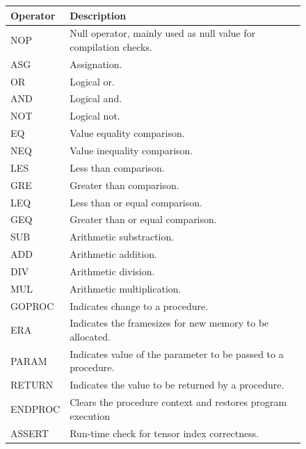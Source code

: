 \begin{figure}[h]
    \centering
    \begin{tabular}{p{1in}p{3in}}
        \toprule
        \textbf{Operator} & \textbf{Description}\\
        \midrule NOP &
        Null operator, mainly used as null value for \newline compilation checks.\\

        \midrule ASG & Assignation.\\

        \midrule OR & Logical or.\\
        \midrule AND & Logical and.\\
        \midrule NOT & Logical not.\\

        \midrule EQ & Value equality comparison.\\
        \midrule NEQ & Value inequality comparison.\\

        \midrule LES & Less than comparison.\\
        \midrule GRE & Greater than comparison.\\
        \midrule LEQ & Less than or equal comparison.\\
        \midrule GEQ & Greater than or equal comparison.\\

        \midrule SUB & Arithmetic substraction.\\
        \midrule ADD & Arithmetic addition.\\
        \midrule DIV & Arithmetic division.\\
        \midrule MUL & Arithmetic multiplication.\\

        \midrule GOPROC &
        Indicates change to a procedure.\\

        \midrule ERA &
        Indicates the framesizes for new memory to be \newline allocated.\\

        \midrule PARAM &
        Indicates value of the parameter to be passed to a procedure.\\

        \midrule RETURN &
        Indicates the value to be returned by a procedure.\\

        \midrule ENDPROC &
        Clears the procedure context and restores program execution\\

        \midrule ASSERT &
        Run-time check for tensor index correctness.\\

        \bottomrule
    \end{tabular}
\end{figure}

